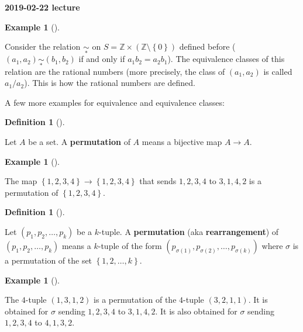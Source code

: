 \documentclass[numbers=enddot,12pt,final,onecolumn,notitlepage]{scrartcl}%
\numberwithin{exer}{subsection}
\theoremstyle{definition}
\newtheorem{defi}[theo]{Definition}
\newenvironment{definition}[1][]
{\begin{defi}[#1]\begin{leftbar}}
{\end{leftbar}\end{defi}}
\newtheorem{exam}[theo]{Example}
\newenvironment{example}[1][]
{\begin{exam}[#1]\begin{leftbar}}
{\end{leftbar}\end{exam}}
\begin{document}
\begin{center}
\textbf{2019-02-22 lecture}
\end{center}

\begin{example}
Consider the relation $\underset{\ast}{\sim}$ on $S=\mathbb{Z}\times\left(
\mathbb{Z}\setminus\left\{  0\right\}  \right)  $ defined before ($\left(
a_{1},a_{2}\right)  \underset{\ast}{\sim}\left(  b_{1},b_{2}\right)  $ if and
only if $a_{1}b_{2}=a_{2}b_{1}$). The equivalence classes of this relation are
the rational numbers (more precisely, the class of $\left(  a_{1}%
,a_{2}\right)  $ is called $a_{1}/a_{2}$). This is how the rational numbers
are defined.
\end{example}

A few more examples for equivalence and equivalence classes:

\begin{definition}
Let $A$ be a set. A \textbf{permutation} of $A$ means a bijective map
$A\rightarrow A$.
\end{definition}

\begin{example}
The map $\left\{  1,2,3,4\right\}  \rightarrow\left\{  1,2,3,4\right\}  $ that
sends $1,2,3,4$ to $3,1,4,2$ is a permutation of $\left\{  1,2,3,4\right\}  $.
\end{example}

\begin{definition}
Let $\left(  p_{1},p_{2},\ldots,p_{k}\right)  $ be a $k$-tuple. A
\textbf{permutation} (aka \textbf{rearrangement}) of $\left(  p_{1}%
,p_{2},\ldots,p_{k}\right)  $ means a $k$-tuple of the form $\left(
p_{\sigma\left(  1\right)  },p_{\sigma\left(  2\right)  },\ldots
,p_{\sigma\left(  k\right)  }\right)  $ where $\sigma$ is a permutation of the
set $\left\{  1,2,\ldots,k\right\}  $.
\end{definition}

\begin{example}
The $4$-tuple $\left(  1,3,1,2\right)  $ is a permutation of the $4$-tuple
$\left(  3,2,1,1\right)  $. It is obtained for $\sigma$ sending $1,2,3,4$ to
$3,1,4,2$. It is also obtained for $\sigma$ sending $1,2,3,4$ to $4,1,3,2$.
\end{example}
\end{document}
